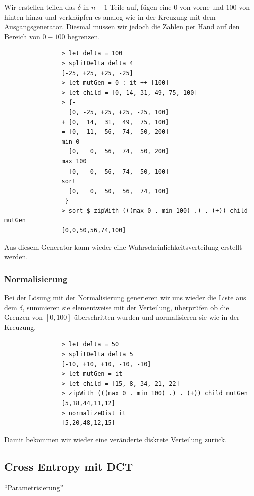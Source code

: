             Wir erstellen teilen das $\delta$ in $n-1$ Teile auf, fügen eine $0$ von vorne und $100$ von hinten hinzu und verknüpfen es analog wie in der Kreuzung mit dem Ausgangsgenerator. Diesmal müssen wir jedoch die Zahlen per Hand auf den Bereich von $0 - 100$ begrenzen.

            \begin{verbatim}
                > let delta = 100
                > splitDelta delta 4
                [-25, +25, +25, -25]
                > let mutGen = 0 : it ++ [100]
                > let child = [0, 14, 31, 49, 75, 100]
                > {-
                  [0, -25, +25, +25, -25, 100]
                + [0,  14,  31,  49,  75, 100]
                = [0, -11,  56,  74,  50, 200]
                min 0
                  [0,   0,  56,  74,  50, 200]
                max 100
                  [0,   0,  56,  74,  50, 100]
                sort
                  [0,   0,  50,  56,  74, 100]
                -}
                > sort $ zipWith (((max 0 . min 100) .) . (+)) child mutGen
                [0,0,50,56,74,100]
            \end{verbatim}

            Aus diesem Generator kann wieder eine Wahrscheinlichkeitsverteilung erstellt werden.

            \subsubsection*{Normalisierung}

            Bei der Lösung mit der Normalisierung generieren wir uns wieder die Liste aus dem $\delta$, summieren sie elementweise mit der Verteilung, überprüfen ob die Grenzen von $[0,100]$ überschritten wurden und normalisieren sie wie in der Kreuzung.

            \begin{verbatim}
                > let delta = 50
                > splitDelta delta 5
                [-10, +10, +10, -10, -10]
                > let mutGen = it
                > let child = [15, 8, 34, 21, 22]
                > zipWith (((max 0 . min 100) .) . (+)) child mutGen
                [5,18,44,11,12]
                > normalizeDist it
                [5,20,48,12,15]
            \end{verbatim}

            Damit bekommen wir wieder eine veränderte diskrete Verteilung zurück.
        \subsection{Cross Entropy mit DCT}
            ``Parametrisierung''
